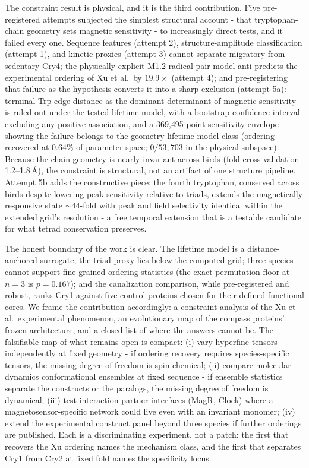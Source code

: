 \documentclass[12pt,a4paper]{article}
\begin{document}
The constraint result is physical, and it is the third contribution. Five pre-registered attempts subjected the simplest structural account - that tryptophan-chain geometry sets magnetic sensitivity - to increasingly direct tests, and it failed every one. Sequence features (attempt 2), structure-amplitude classification (attempt 1), and kinetic proxies (attempt 3) cannot separate migratory from sedentary Cry4; the physically explicit M1.2 radical-pair model anti-predicts the experimental ordering of Xu et al.\ by $19.9\times$ (attempt 4); and pre-registering that failure as the hypothesis converts it into a sharp exclusion (attempt 5a): terminal-Trp edge distance as the dominant determinant of magnetic sensitivity is ruled out under the tested lifetime model, with a bootstrap confidence interval excluding any positive association, and a 369{,}495-point sensitivity envelope showing the failure belongs to the geometry-lifetime model class (ordering recovered at $0.64\%$ of parameter space; $0/53{,}703$ in the physical subspace). Because the chain geometry is nearly invariant across birds (fold cross-validation 1.2--1.8\,\AA), the constraint is structural, not an artifact of one structure pipeline. Attempt 5b adds the constructive piece: the fourth tryptophan, conserved across birds despite lowering peak sensitivity relative to triads, extends the magnetically responsive state $\sim$44-fold with peak and field selectivity identical within the extended grid's resolution - a free temporal extension that is a testable candidate for what tetrad conservation preserves.

The honest boundary of the work is clear. The lifetime model is a distance-anchored surrogate; the triad proxy lies below the computed grid; three species cannot support fine-grained ordering statistics (the exact-permutation floor at $n=3$ is $p=0.167$); and the canalization comparison, while pre-registered and robust, ranks Cry1 against five control proteins chosen for their defined functional cores. We frame the contribution accordingly: a constraint analysis of the Xu et al.\ experimental phenomenon, an evolutionary map of the compass proteins' frozen architecture, and a closed list of where the answers cannot be. The falsifiable map of what remains open is compact: (i) vary hyperfine tensors independently at fixed geometry - if ordering recovery requires species-specific tensors, the missing degree of freedom is spin-chemical; (ii) compare molecular-dynamics conformational ensembles at fixed sequence - if ensemble statistics separate the constructs or the paralogs, the missing degree of freedom is dynamical; (iii) test interaction-partner interfaces (MagR, Clock) where a magnetosensor-specific network could live even with an invariant monomer; (iv) extend the experimental construct panel beyond three species if further orderings are published. Each is a discriminating experiment, not a patch: the first that recovers the Xu ordering names the mechanism class, and the first that separates Cry1 from Cry2 at fixed fold names the specificity locus.
\end{document}
